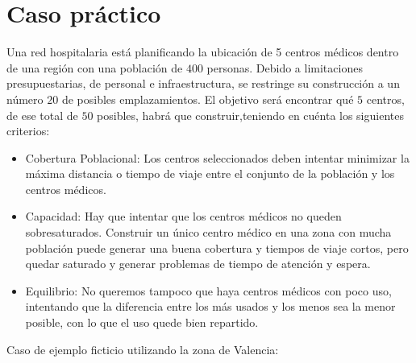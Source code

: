 \documentclass[12pt,a4paper]{book}
\begin{document}
\section{Caso práctico}

Una red hospitalaria está planificando la ubicación de 5 centros médicos dentro de una región con una población de $400$ personas. Debido a limitaciones presupuestarias, de personal e infraestructura, se restringe su construcción a un número $20$ de posibles emplazamientos. El objetivo será encontrar qué $5$ centros, de ese total de $50$ posibles, habrá que construir,teniendo en cuénta los siguientes criterios:

\begin{itemize}
    \item Cobertura Poblacional: Los centros seleccionados deben intentar minimizar la máxima distancia o tiempo de viaje entre el conjunto de la población y los centros médicos.
    \item Capacidad: Hay que intentar que los centros médicos no queden sobresaturados. Construir un único centro médico en una zona con mucha población puede generar una buena cobertura y tiempos de viaje cortos, pero quedar saturado y generar problemas de tiempo de atención y espera.
    \item Equilibrio: No queremos tampoco que haya centros médicos con poco uso, intentando que la diferencia entre los más usados y los menos sea la menor posible, con lo que el uso quede bien repartido.
\end{itemize}
Caso de ejemplo ficticio utilizando la zona de Valencia:
\end{document}
